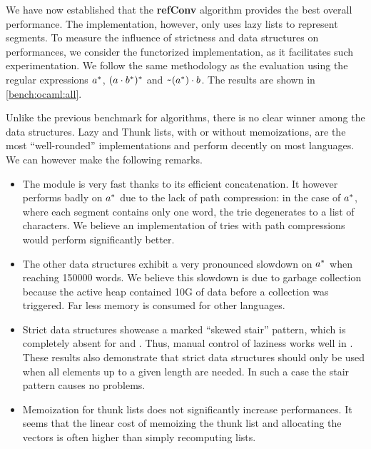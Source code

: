 We have now established that the \textbf{refConv} algorithm
provides the best overall performance.  The \haskell implementation,
however, only uses lazy lists to represent segments.
To measure the influence of strictness and data structures on
performances, we consider the functorized \ocaml implementation, as it facilitates such experimentation.
We follow the same methodology as the \haskell evaluation using the
regular expressions $a^*$, $(a \cdot{b^*})^*$ and
$\texttt{\textasciitilde}{(a^*)} \cdot{b}$.  The results are shown in
\cref{bench:ocaml:all}.

Unlike the previous benchmark for algorithms, there is no clear winner
among the data structures.
Lazy and Thunk lists, with or without memoizations, are the most ``well-rounded''
implementations and perform decently on most languages.
We can however make the following remarks.
\begin{itemize}[leftmargin=*]
\item The  module
  is very fast thanks to its efficient concatenation.
  It however performs badly on $a^*$
  due to the lack of path compression:
  in the case of $a^*$, where each segment contains only one word, the
  trie degenerates to a list of characters.
  We believe an implementation of tries with path compressions would perform
  significantly better.
\item The other data structures exhibit a very pronounced slowdown on $a^*$
  when reaching 150000 words.
  We believe this slowdown is due to garbage collection because
  the active heap contained 10G of data before
  a collection was triggered. Far less memory is consumed for other languages.
\item Strict data structures showcase a marked ``skewed
  stair'' pattern, which is completely absent for  and
  . Thus, manual control of laziness works well in
  \ocaml. These results also demonstrate that strict data structures
  should only be used when all elements up to a given length are
  needed. In such a case the stair pattern causes no problems.
\item Memoization for thunk lists does not significantly increase performances.
  It seems that the linear cost of memoizing the thunk list and
  allocating the vectors
  is often higher than simply recomputing lists.
\end{itemize}



